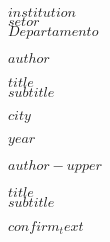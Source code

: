 \thispagestyle{empty}

\begin{center}
    \textbf{\MakeUppercase{$institution$}}\\[0.5em]
    \textbf{$setor$}\\
    \textbf{$Departamento$}
\end{center}


\vspace{2.0cm}


\begin{center}
$author$

\vspace{6.cm}

{\textbf{\MakeUppercase{$title$}}}\\[1em]
{\normalsize $subtitle$}
\end{center}

\vspace{9.0cm}






\begin{center}

$city$ 

$year$
    
\end{center}

\newpage




\thispagestyle{empty}

\begin{center}
$author-upper$
\end{center}

\vspace{3.0cm}

\begin{center}
    {\textbf{\MakeUppercase{$title$}}}\\[1em]
    {\normalsize $subtitle$}
\end{center}

\vspace{3.0cm}

\begin{adjustwidth}{7.5cm}{0cm}
    \justifying
    $confirm_text$
\end{adjustwidth}

\vspace{1.0cm}


\vspace{3.5cm}

